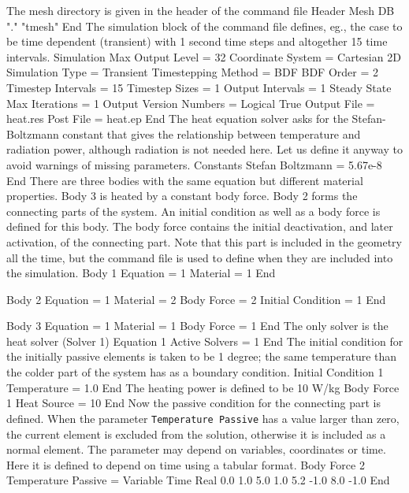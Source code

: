 The mesh directory is given in the header of the command file
%
\ttbegin
Header
  Mesh DB "." "tmesh"
End
\ttend
%
The simulation block of the command file defines, eg., the case to be time
dependent (transient) with 1 second time steps and altogether 15 time
intervals.  
%
\ttbegin
Simulation
  Max Output Level = 32
  Coordinate System = Cartesian 2D
  Simulation Type = Transient
  Timestepping Method = BDF
  BDF Order = 2
  Timestep Intervals = 15
  Timestep Sizes = 1
  Output Intervals = 1
  Steady State Max Iterations = 1
  Output Version Numbers = Logical True
  Output File = heat.res
  Post File = heat.ep
End
\ttend
%
The heat equation solver asks for the Stefan-Boltzmann constant that
gives the relationship between temperature and radiation power,
although radiation is not needed here. Let us define it anyway to
avoid warnings of missing parameters.
%
\ttbegin
Constants
  Stefan Boltzmann = 5.67e-8
End
\ttend
%
There are three bodies with the same equation but different material
properties. Body 3 is heated by a constant body force. Body 2 forms
the connecting parts of the system. An initial condition as well as a
body force is defined for this body. The body force contains the
initial deactivation, and later activation, of the connecting
part. Note that this part is included in the geometry all the time,
but the command file is used to define when they are included into the
simulation.
%
\ttbegin
Body 1
  Equation = 1
  Material = 1
End

Body 2
  Equation = 1
  Material = 2
  Body Force = 2
  Initial Condition = 1
End

Body 3
  Equation = 1
  Material = 1
  Body Force = 1
End
\ttend
%
The only solver is the heat solver (Solver 1)
%
\ttbegin
Equation 1
  Active Solvers = 1
End
\ttend
%
The initial condition for the initially passive elements is taken to
be 1 degree; the same temperature than the colder part of the system
has as a boundary condition.
%
\ttbegin
Initial Condition 1
  Temperature = 1.0
End
\ttend
%
The heating power is defined to be 10 W/kg
%
\ttbegin
Body Force 1
  Heat Source = 10
End
\ttend
%
Now the passive condition for the connecting part is defined. When the
parameter \texttt{Temperature Passive} has a value larger than zero,
the current element is excluded from the solution, otherwise it is
included as a normal element. The parameter may depend on variables,
coordinates or time. Here it is defined to depend on time using a
tabular format.
%
\ttbegin
Body Force 2
  Temperature Passive = Variable Time
    Real
      0.0    1.0
      5.0    1.0
      5.2   -1.0
      8.0   -1.0
    End

